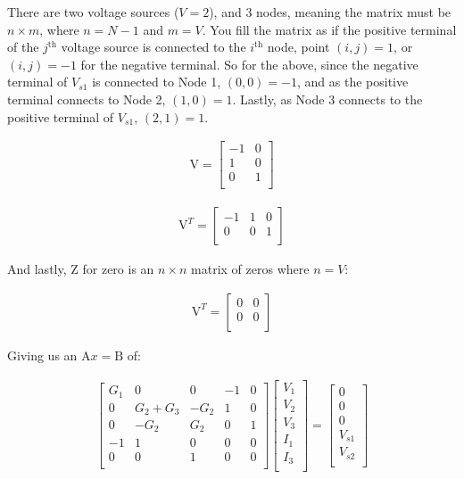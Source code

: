 \documentclass[12pt]{report}
\begin{document}
There are two voltage sources ($V = 2$), and 3 nodes, meaning the matrix must be $n \times m$, where $n = N-1$ and $m = V$. You fill the matrix as if the positive terminal of the $j^{\mathrm{th}}$ voltage source is connected to the $i^{\mathrm{th}}$ node, point $(i,j) = 1$, or $(i,j) = -1$ for the negative terminal. So for the above, since the negative terminal of $V_{s1}$ is connected to Node 1, $(0,0) = -1$, and as the positive terminal connects to Node 2, $(1,0) = 1$. Lastly, as Node 3 connects to the positive terminal of $V_{s1}$, $(2,1) = 1$. 
\begin{multicols}{2}
\begin{align}
\mathrm{V} = 
\begin{bmatrix} 
-1 & 0 \\
1 & 0  \\
0 & 1  \\
\end{bmatrix}
\end{align}

\begin{align}
\mathrm{V}^T = 
\begin{bmatrix} 
-1 & 1 & 0 \\
0 & 0  & 1 \\
\end{bmatrix}
\end{align}
\end{multicols}

And lastly, Z for zero is an $n \times n$ matrix of zeros where $n = V$:

\begin{align}
\mathrm{V}^T = 
\begin{bmatrix} 
0 & 0  \\
0 & 0   \\
\end{bmatrix}
\end{align}

Giving us an $\mathrm{A}x = \mathrm{B}$ of: 

\begin{align}
\begin{bmatrix} 
G_1 & 0 & 0 & -1 & 0 \\
0 & G_2 + G_3 & -G_2 & 1 & 0  \\
0 & -G_2 & G_2 & 0 & 1  \\
-1 & 1 & 0 & 0 & 0  \\
0 & 0  & 1 & 0 & 0  \\
\end{bmatrix}
\begin{bmatrix} 
V_1 \\
V_2  \\
V_3  \\
I_1  \\
I_3 \\
\end{bmatrix}
=
\begin{bmatrix} 
0 \\
0  \\
0  \\
V_{s1}  \\
V_{s2} \\
\end{bmatrix}
\end{align}
\end{document}
